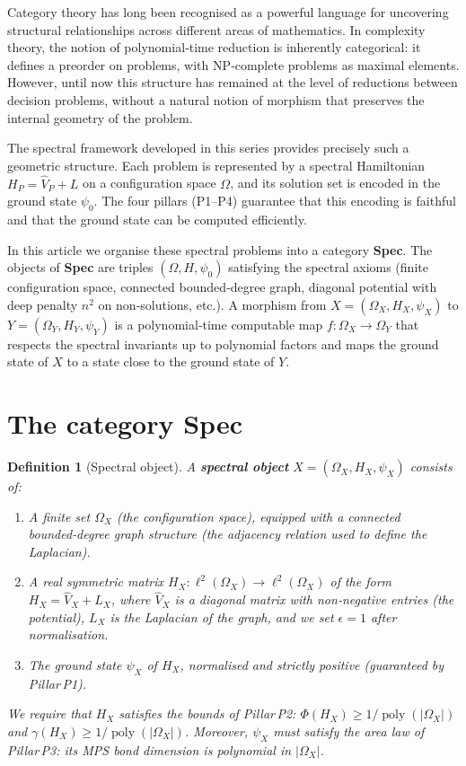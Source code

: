 \documentclass[11pt,a4paper]{article}
\newtheorem{definition}[theorem]{Definition}
\begin{document}
Category theory has long been recognised as a powerful language for uncovering structural relationships across different areas of mathematics. In complexity theory, the notion of polynomial‑time reduction is inherently categorical: it defines a preorder on problems, with NP‑complete problems as maximal elements. However, until now this structure has remained at the level of reductions between decision problems, without a natural notion of morphism that preserves the internal geometry of the problem.

The spectral framework developed in this series provides precisely such a geometric structure. Each problem is represented by a spectral Hamiltonian $H_P = \hat{V}_P + L$ on a configuration space $\Omega$, and its solution set is encoded in the ground state $\psi_0$. The four pillars (P1–P4) guarantee that this encoding is faithful and that the ground state can be computed efficiently.

In this article we organise these spectral problems into a category \textbf{Spec}. The objects of \textbf{Spec} are triples $(\Omega, H, \psi_0)$ satisfying the spectral axioms (finite configuration space, connected bounded‑degree graph, diagonal potential with deep penalty $n^2$ on non‑solutions, etc.). A morphism from $X = (\Omega_X, H_X, \psi_X)$ to $Y = (\Omega_Y, H_Y, \psi_Y)$ is a polynomial‑time computable map $f: \Omega_X \to \Omega_Y$ that respects the spectral invariants up to polynomial factors and maps the ground state of $X$ to a state close to the ground state of $Y$.

\section{The category Spec}

\begin{definition}[Spectral object]
A \textbf{spectral object} $X = (\Omega_X, H_X, \psi_X)$ consists of:
\begin{enumerate}
\item A finite set $\Omega_X$ (the configuration space), equipped with a connected bounded‑degree graph structure (the adjacency relation used to define the Laplacian).
\item A real symmetric matrix $H_X: \ell^2(\Omega_X) \to \ell^2(\Omega_X)$ of the form $H_X = \hat{V}_X + L_X$, where $\hat{V}_X$ is a diagonal matrix with non‑negative entries (the potential), $L_X$ is the Laplacian of the graph, and we set $\epsilon = 1$ after normalisation.
\item The ground state $\psi_X$ of $H_X$, normalised and strictly positive (guaranteed by Pillar P1).
\end{enumerate}
We require that $H_X$ satisfies the bounds of Pillar P2: $\Phi(H_X) \ge 1/\operatorname{poly}(|\Omega_X|)$ and $\gamma(H_X) \ge 1/\operatorname{poly}(|\Omega_X|)$. Moreover, $\psi_X$ must satisfy the area law of Pillar P3: its MPS bond dimension is polynomial in $|\Omega_X|$.
\end{definition}
\end{document}
